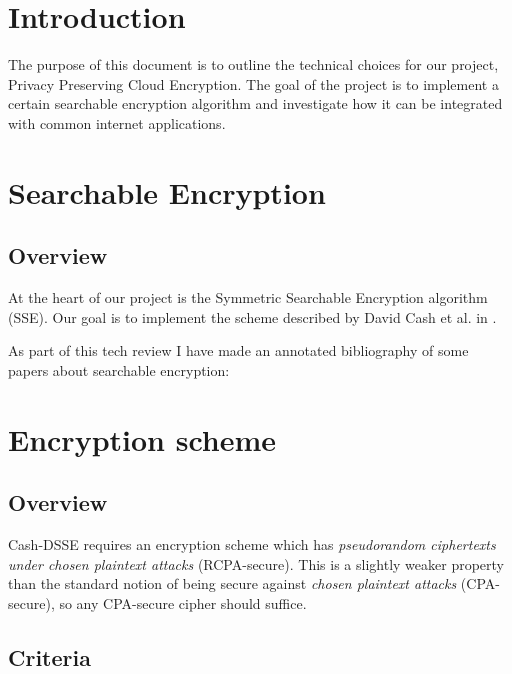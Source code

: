 \documentclass[onecolumn, draftclsnofoot,10pt, compsoc]{IEEEtran}
\begin{document}
\section{ Introduction }

The purpose of this document is to outline the technical choices for our project, Privacy Preserving Cloud Encryption. The goal of the project is to implement a certain searchable encryption algorithm and investigate how it can be integrated with common internet applications.


\section{ Searchable Encryption }

\subsection{ Overview }

At the heart of our project is the Symmetric Searchable Encryption algorithm (SSE).
Our goal is to implement the scheme described by David Cash et al. in \cite{cash14}.

As part of this tech review I have made an annotated bibliography of some papers about searchable encryption:
\cite{yavuz}
\cite{cash14}


\section{ Encryption scheme }

\subsection{ Overview }

Cash-DSSE requires an encryption scheme which has \textit{pseudorandom ciphertexts under chosen plaintext attacks} (RCPA-secure).
This is a slightly weaker property than the standard notion of being secure against \textit{chosen plaintext attacks} (CPA-secure),
so any CPA-secure cipher should suffice.

\subsection{ Criteria }
\end{document}
